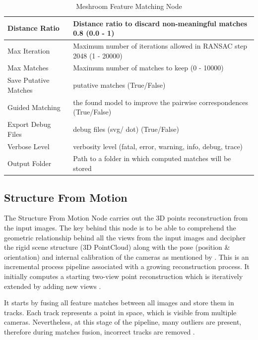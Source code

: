 \documentclass[12pt]{report}
\begin{document}
\begin{table}[H]
{\begin{tabular}{|l|l|}
        Distance Ratio &
          Distance ratio to discard non-meaningful matches 0.8 (0.0 - 1) \\ \hline
        Max Iteration &
          Maximum number of iterations allowed in RANSAC step 2048 (1 - 20000) \\ \hline
        Max Matches &
          Maximum number of matches to keep (0 - 10000) \\ \hline
        Save Putative Matches &
          putative matches (True/False) \\ \hline
        Guided Matching &
          the found model to improve the pairwise correspondences (True/False) \\ \hline
        Export Debug Files &
          debug files (svg/ dot) (True/False) \\ \hline
        Verbose Level &
          verbosity level (fatal, error, warning, info, debug, trace) \\ \hline
        Output Folder &
          Path to a folder in which computed matches will be stored \\ \hline
        \end{tabular}%
        }
        \caption{Meshroom Feature Matching Node}
        \label{tab:FeatureMatching}
        \end{table}
      
      
\subsection{Structure From Motion}

The Structure From Motion Node carries out the 3D points reconstruction from the input images. The key behind this node is to be able to comprehend
the geometric relationship behind all the views from the input images and decipher the rigid scene structure (3D PointCloud) along with the pose (position \& orientation) and internal calibration of the cameras as mentioned by .
This is an incremental process pipeline associated with a growing reconstruction process. It initially computes a starting two-view point reconstruction which is iteratively extended by adding new views .

It starts by fusing all feature matches between all images and store them in tracks. Each track represents a point in space, which is visible from multiple cameras. 
Nevertheless, at this stage of the pipeline, many outliers are present, therefore during matches fusion, incorrect tracks are removed \citep*{Fischler1981RandomSC}.
\end{document}

